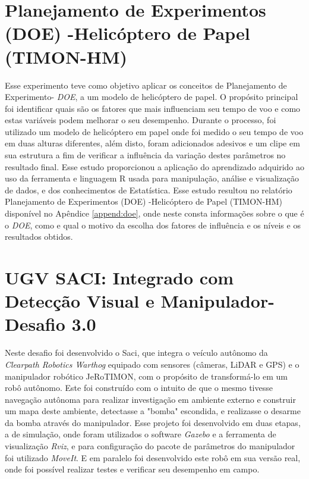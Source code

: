 \section{Planejamento de Experimentos (DOE) -Helicóptero de Papel (TIMON-HM)}
\label{sec:analise_doe}
Esse experimento teve como objetivo aplicar os conceitos de Planejamento de Experimento- \textit{DOE}, a um modelo de helicóptero de papel. O propósito principal foi identificar quais são os fatores que mais influenciam seu tempo de voo e como estas variáveis podem melhorar o seu desempenho. Durante o processo, foi utilizado um modelo de helicóptero em papel onde foi medido o seu tempo de voo em duas alturas diferentes, além disto, foram adicionados adesivos e um clipe em sua estrutura a fim de verificar a influência da variação destes parâmetros no resultado final. Esse estudo proporcionou a aplicação do aprendizado adquirido ao uso da ferramenta e linguagem R usada para manipulação, análise e visualização de dados, e dos conhecimentos de Estatística. 
Esse estudo resultou no relatório Planejamento de Experimentos (DOE) -Helicóptero de Papel (TIMON-HM) disponível no Apêndice \ref{append:doe}, onde neste consta informações sobre o que é o \textit{DOE}, como e qual o motivo da escolha dos fatores de influência e os níveis e os resultados obtidos. 



\section{UGV SACI: Integrado com Detecção Visual e Manipulador- Desafio 3.0}
\label{sec:desafio_3_0}
Neste desafio foi desenvolvido o Saci, que integra o veículo autônomo da \textit{Clearpath Robotics Warthog} equipado com sensores (câmeras, LiDAR e GPS) e o manipulador robótico JeRoTIMON, com o propósito de transformá-lo em um robô autônomo. Este foi construído com o intuito de que o mesmo tivesse navegação autônoma para realizar investigação em ambiente externo e construir um mapa deste ambiente, detectasse a "bomba" escondida, e realizasse o desarme da bomba através do manipulador. 
Esse projeto foi desenvolvido em duas etapas, a de simulação, onde foram utilizados o software  \textit{Gazebo} e a ferramenta de visualização \textit{Rviz}, e para configuração do pacote de parâmetros do manipulador foi utilizado \textit{MoveIt}. E em paralelo foi desenvolvido este robô em sua versão real, onde foi possível realizar testes e verificar seu desempenho em campo.

